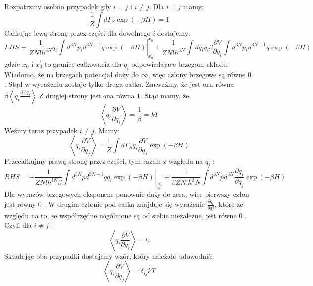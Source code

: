 \documentclass[12pt,a4paper]{article}
\begin{document}
Rozpatrzmy osobno przypadek gdy $i=j$ i $i \neq j .$ Dla $i=j$ mamy:
$$
\frac{1}{Z} \int d \Gamma_{S} \exp (-\beta H)=1
$$
Całkując lewą stronę przez części dla dowolnego $i$ dostajemy:
$$
L H S=\left.\frac{1}{Z N ! h^{3 N}} q_{i} \int d^{3 N} p_{i} d^{3 N-1} q \exp (-\beta H)\right|_{x_{0}^{\prime}} ^{x_{0}}+\frac{1}{Z N ! h^{3 N}} \int d q_{i} q_{i} \beta \frac{\partial V}{\partial q_{i}} \int d^{3 N} p_{i} d^{3 N-1} q \exp (-\beta H)
$$
gdzie $x_{0}$ i $x_{0}^{\prime}$ to granice całkowania dla $q_{i}$ odpowiadajace brzegom układu. Wiadomo, że na brzegach potencjał dąży do $\infty$, więc człony brzegowe są równe 0 . Stąd w wyrażeniu zostaje tylko druga całka. Zauważmy, że jest ona równa $\beta\left\langle q_{i} \frac{\partial \mathcal{V} q_{j}}{}\right\rangle . \mathrm{Z}$ drugiej strony jest ona równa 1. Stąd mamy, że:
$$
\left\langle q_{i} \frac{\partial V}{\partial q_{i}}\right\rangle=\frac{1}{\beta}=k T
$$
Weźmy teraz przypadek $i \neq j$. Mamy:
$$
\left\langle q_{i} \frac{\partial V}{\partial q_{j}}\right\rangle=\frac{1}{Z} \int d \Gamma_{S} q_{i} \frac{\partial V}{\partial q_{j}} \exp (-\beta H)
$$
Przecałkujmy prawą stronę przez części, tym razem z względu na $q_{j}$ :
$$
R H S=-\left.\frac{1}{Z N ! h^{3 N} \beta} \int d^{3 N} p d^{3 N-1} q q_{i} \exp (-\beta H)\right|_{x_{0}^{x_{0}}}+\frac{1}{\beta Z N ! h^{3} N} \int d^{3 N} p d^{3 N} \frac{\partial q_{i}}{\partial q_{j}} \exp (-\beta H)
$$
Dla wyrazów brzegowych eksponens ponownie dąży do zera, więc pierwszy człon jest równy 0 . W drugim członie pod całką znajduje się wyrażenie $\frac{\partial q_{i}}{\partial q j}$, które ze względu na to, że współrzędne uogólnione są od siebie niezależne, jest równe 0 . Czyli dla $i \neq j$ :
$$
\left\langle q_{i} \frac{\partial V}{\partial q_{i}}\right\rangle=0
$$
Składając oba przypadki dostajemy wzór, który należało udowodnić:
$$
\left\langle q_{i} \frac{\partial V}{\partial q_{j}}\right\rangle=\delta_{i j} k T
$$
\end{document}
